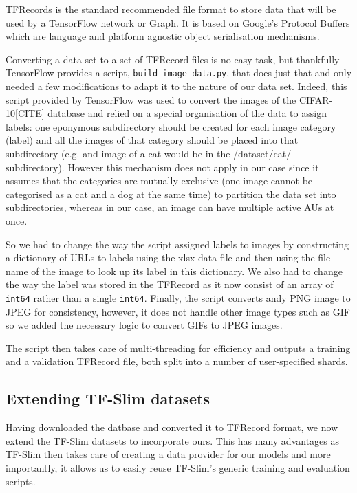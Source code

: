\documentclass[12pt,twoside]{article}
\begin{document}
TFRecords is the standard recommended file format to store data that will be used by a TensorFlow network or Graph. It is based on Google's Protocol Buffers which are language and platform agnostic object serialisation mechanisms. 

Converting a data set to a set of TFRecord files is no easy task, but thankfully TensorFlow provides a script, \texttt{build\_image\_data.py}, that does just that and only needed a few modifications to adapt it to the nature of our data set. Indeed, this script provided by TensorFlow was used to convert the images of the CIFAR-10[CITE] database and relied on a special organisation of the data to assign labels: one eponymous subdirectory should be created for each image category (label) and all the images of that category should be placed into that subdirectory (e.g. and image of a cat would be in the /dataset/cat/ subdirectory). However this mechanism does not apply in our case since it assumes that the categories are mutually exclusive (one image cannot be categorised as a cat and a dog at the same time) to partition the data set into subdirectories, whereas in our case, an image can have multiple active AUs at once.

So we had to change the way the script assigned labels to images by constructing a dictionary of URLs to labels using the xlsx data file and then using the file name of the image to look up its label in this dictionary. We also had to change the way the label was stored in the TFRecord as it now consist of an array of \texttt{int64} rather than a single \texttt{int64}. Finally, the script converts andy PNG image to JPEG for consistency, however, it does not handle other image types such as GIF so we added the necessary logic to convert GIFs to JPEG images.

The script then takes care of multi-threading for efficiency and outputs a training and a validation TFRecord file, both split into a number of user-specified shards.

\subsection{Extending TF-Slim datasets}

Having downloaded the datbase and converted it to TFRecord format, we now
extend the TF-Slim datasets to incorporate ours. This has many advantages as
TF-Slim then takes care of creating a data provider for our models and more
importantly, it allows us to easily reuse TF-Slim's generic training and
evaluation scripts.
\end{document}
